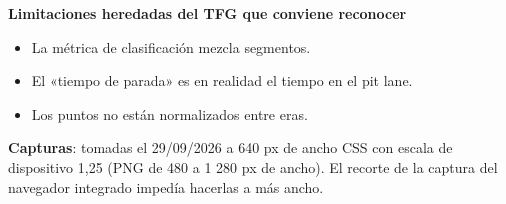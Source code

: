 \textbf{Limitaciones heredadas del TFG que conviene reconocer}

\begin{itemize}
\item La métrica de clasificación mezcla segmentos.
\item El «tiempo de parada» es en realidad el tiempo en el pit lane.
\item Los puntos no están normalizados entre eras.
\end{itemize}

\textbf{Capturas}: tomadas el 29/09/2026 a 640 px de ancho CSS con escala de dispositivo 1,25 (PNG de 480 a 1 280 px de ancho). El recorte de la captura del navegador integrado impedía hacerlas a más ancho.
